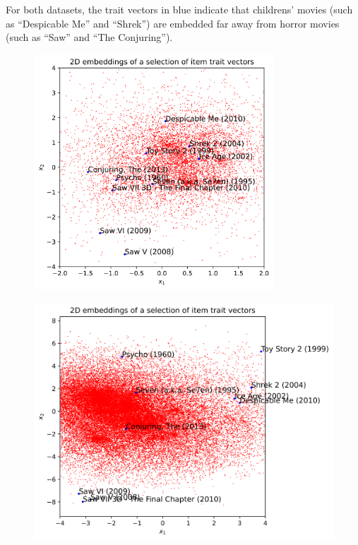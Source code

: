 \documentclass{article}
\begin{document}
For both datasets, the trait vectors in blue indicate that childrens' movies (such as ``Despicable Me'' and ``Shrek'') 
are embedded far away from horror movies (such as ``Saw'' and ``The Conjuring'').

\begin{figure}[h!]
    \centering
    \begin{minipage}{.5\textwidth}
      \centering
      \captionsetup{justification=centering}
      \includegraphics[width=0.8\textwidth]{graphics/small_2D_items.png}
      \label{r5}
    \end{minipage}%
    \begin{minipage}{.5\textwidth}
      \centering
      \captionsetup{justification=centering}
      \includegraphics[width=\textwidth]{graphics/full_2D_items.png}
      \label{r6}
    \end{minipage}
\end{figure}
\end{document}
